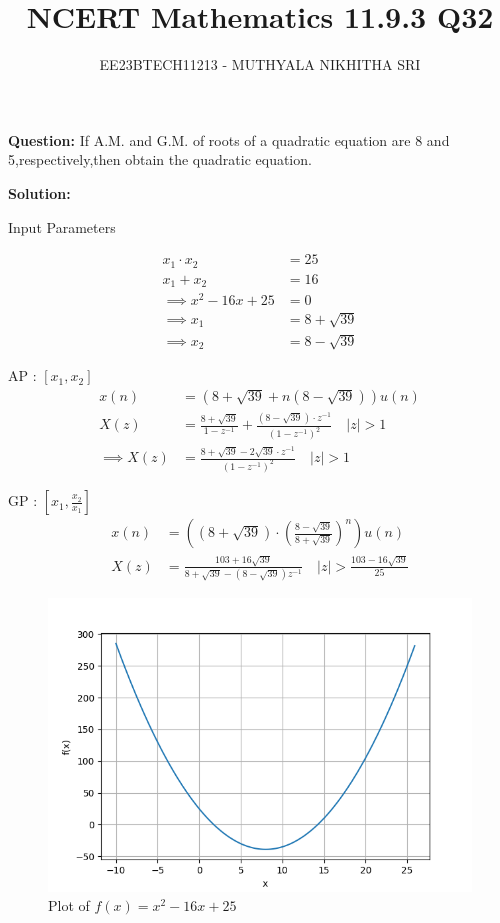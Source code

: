 \documentclass[journal,12pt,twocolumn]{IEEEtran}
\title{
	
\title{NCERT Mathematics 11.9.3 Q32}
\author{EE23BTECH11213 - MUTHYALA NIKHITHA SRI
}


}
\providecommand{\brak}[1]{\ensuremath{\left(#1\right)}}
\theoremstyle{remark}
\begin{document}
\maketitle

\textbf{Question:} 
If A.M. and G.M. of roots of a quadratic equation are 8 and 5,respectively,then obtain the quadratic equation.

\textbf{Solution: }

\begin{table}[h]
 	\centering
 	\resizebox{6 cm}{!}{
 		
 	}
 	\caption{Input Parameters}
    \label{tab:table_9.3.32}
 \end{table}


\begin{align}
x_1 \cdot x_2 &= 25 \\
x_1 + x_2 &= 16 \\
\implies  x^2 - 16x + 25 &= 0 \\
\implies x_1 &= 8+\sqrt{39} \\
\implies x_2 &= 8-\sqrt{39} 
\end{align}

AP : $[x_1 , x_2]$ 
\begin{align}
x\brak{n} &= \brak{8+\sqrt{39} + n\brak{8-\sqrt{39}}}u\brak{n} \\
X\brak{z} &= \frac{8+\sqrt{39}}{1 - z^{-1}} + \frac{\brak{8-\sqrt{39}}\cdot z^{-1}}{\brak{1 - z^{-1}}^2}  \quad |z| > 1 \\
\implies X\brak{z} &= \frac{8+\sqrt{39}-2\sqrt{39}\cdot{z^{-1}}}{\brak{1 - z^{-1}}^2} \quad |z| > 1
\end{align}

GP : $[x_1 , \frac{x_2}{x_1}]$
\begin{align}
x\brak{n} &= \brak{\brak{8+\sqrt{39}}\cdot {\brak{\frac{8-\sqrt{39}}{8+\sqrt{39}}}}^{n}}u\brak{n} \\
X\brak{z} &= \frac{103+16\sqrt{39}}{8+\sqrt{39}-\brak{8-\sqrt{39}}z^{-1}} \quad |z| > \frac{103-16\sqrt{39}}{25}
\end{align}

\begin{figure}[h!]
    \centering
    \includegraphics[width=\columnwidth]{figs/f1.png}
    \caption{Plot of $f\brak{x} = x^{2}-16x+25$}
    \label{fig:1}
\end{figure}
\end{document}
